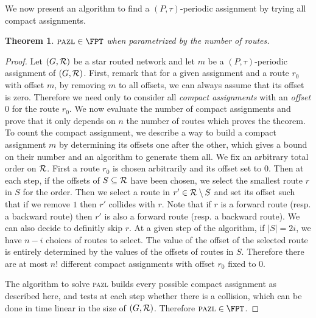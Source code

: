 \documentclass[10pt, conference, letterpaper]{IEEEtran}
\newtheorem{theorem}{Theorem}
\newcommand\pazl{\textsc{pazl}\xspace}
\begin{document}
We now present an algorithm to find a $(P,\tau)$-periodic assignment by trying all compact assignments.

\begin{theorem}\label{th:FPT}
$\pazl \in \FPT$ when parametrized by the number of routes.
\end{theorem}
\begin{proof}
Let $(G, {\cal R})$ be a star routed network and let $m$ be a $(P,\tau)$-periodic assignment of $(G, {\cal R})$. First, remark that for a given assignment and a route $r_0$ with offset $m$, by removing $m$ to all offsets, we can always assume that its offset is zero. Therefore we need only to consider all \emph{compact assignments} with an \emph{offset $0$} for the route $r_0$. 
We now evaluate the number of compact assignments and prove that it only depends
on $n$ the number of routes which proves the theorem. To count the compact assignment, we describe a way to build a compact assignment $m$ by determining its offsets one after the other, which gives a bound on their number and an algorithm to generate them all. We fix an arbitrary total order on ${\cal R}$.
First a route $r_0$ is chosen arbitrarily and its offset set to $0$. 
Then at each step, if the offsets of $S \subseteq  {\cal R}$ have been chosen,
we select the smallest route $r$ in $S$ for the order. 
Then we select a route in $r' \in {\cal R} \setminus S$ and set its offset such that 
if we remove $1$ then $r'$ collides with $r$. Note that if $r$ is a forward route (resp. a backward route) then $r'$ is also a forward route (resp. a backward route). We can also decide to definitly skip $r$. At a given step of the algorithm, if $|S| = 2i$, we have $n-i$ choices 
of routes to select. The value of the offset of the selected route is entirely determined by the values of the offsets of routes in $S$. Therefore there are at most $n!$ different compact assignments with offset $r_0$ fixed to $0$. 

The algorithm to solve \pazl builds every possible compact assignment as described here, and
tests at each step whether there is a collision, which can be done in time linear in the size of 
$(G, {\cal R})$. Therefore $\pazl \in \FPT$.
\end{proof}
\end{document}

